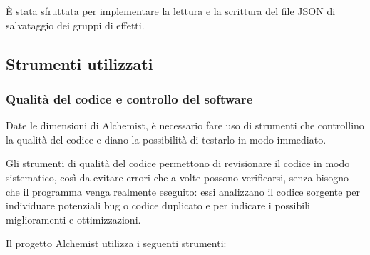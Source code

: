                 È stata sfruttata per implementare la lettura e la scrittura del file JSON di salvataggio dei gruppi di effetti.

        \subsection{Strumenti utilizzati}\label{sub:strum}
            \subsubsection{Qualità del codice e controllo del software}\label{subsub:codeQuality}
                Date le dimensioni di Alchemist, è necessario fare uso di strumenti che controllino la qualità del codice e diano la possibilità di testarlo in modo immediato.

                Gli strumenti di qualità del codice permettono di revisionare il codice in modo sistematico, così da evitare errori che a volte possono verificarsi, senza bisogno che il programma venga realmente eseguito: essi analizzano il codice sorgente per individuare potenziali bug o codice duplicato e per indicare i possibili miglioramenti e ottimizzazioni.

                Il progetto Alchemist utilizza i seguenti strumenti:

